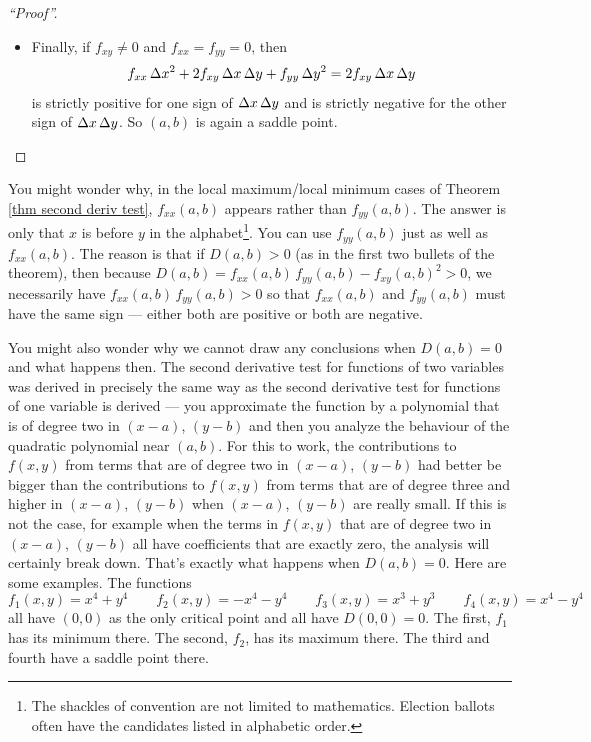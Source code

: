\begin{proof}[``Proof'']
\begin{itemize}
\item
Finally, if $f_{xy}\ne 0$ and $f_{xx}=f_{yy}=0$, then
\begin{equation*}
f_{xx}\,\Delta x^2
       +2f_{xy}\,\Delta x\,\Delta y 
       + f_{yy}\,\Delta y^2 
=2f_{xy}\,\Delta x\,\Delta y 
\end{equation*}
is strictly positive for one sign of $\Delta x\,\Delta y$ and is strictly
negative for the other sign of $\Delta x\,\Delta y$. So 
$(a,b)$ is again a saddle point.
\end{itemize}
\end{proof}

You might wonder why, in the local maximum/local minimum cases
of Theorem \ref{thm second deriv test}, $f_{xx}(a,b)$ appears rather 
than $f_{yy}(a,b)$. The answer
is only that $x$ is before $y$ in the alphabet\footnote{The shackles of convention are not limited to mathematics. Election ballots often have the candidates listed in alphabetic order.}. You can use $f_{yy}(a,b)$
just as well as $f_{xx}(a,b)$. The reason is that if 
$D(a,b)>0$ (as in the first two bullets of the theorem),
then because $D(a,b) = f_{xx}(a,b)\,f_{yy}(a,b) - f_{xy}(a,b)^2>0$,
we necessarily have $f_{xx}(a,b)\,f_{yy}(a,b)>0$ so that 
$f_{xx}(a,b)$ and $f_{yy}(a,b)$ must have the same sign --- either both
are positive or both are negative.

You might also wonder why we cannot draw any conclusions when $D(a,b)=0$
and what happens then. The second derivative test for functions
 of two variables was derived in precisely the same way as the second derivative
test for functions of one variable is derived --- you approximate the function
by a polynomial that is of degree two in $(x-a)$, $(y-b)$ and then
you analyze the behaviour of the quadratic polynomial near $(a,b)$.
For this to work, the contributions to $f(x,y)$ from terms that 
are of degree two in  $(x-a)$, $(y-b)$ had better be bigger than  
the contributions to $f(x,y)$ from terms that are of degree three
and higher in  $(x-a)$, $(y-b)$ when $(x-a)$, $(y-b)$ are really small. 
If this is not the case, for example when the terms in $f(x,y)$ that are 
of degree two in  $(x-a)$, $(y-b)$ all have coefficients that are exactly 
zero, the analysis will certainly break down. That's exactly what happens 
when $D(a,b)=0$. Here are some examples. The functions
\begin{equation*}
f_1(x,y)=x^4+y^4\qquad
f_2(x,y)=-x^4-y^4\qquad
f_3(x,y)=x^3+y^3\qquad
f_4(x,y)=x^4-y^4
\end{equation*}
all have $(0,0)$ as the only critical point and all have $D(0,0)=0$. 
The first, $f_1$ has its minimum there. The second, $f_2$, has 
its maximum there. The third and fourth have a saddle point there.

